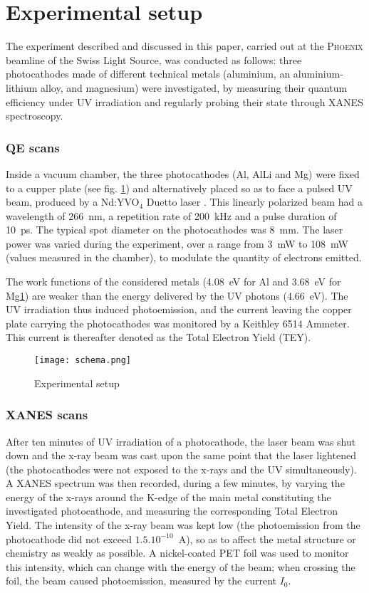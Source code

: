 \documentclass[aip,graphicx]{revtex4-1}
\begin{document}
\section{Experimental setup}

The experiment described and discussed in this paper, carried out at the \textsc{Phoenix} beamline of the Swiss Light Source, was conducted as follows: three photocathodes made of different technical metals (aluminium, an aluminium-lithium alloy, and magnesium) were investigated, by measuring their quantum efficiency under UV irradiation and regularly probing their state through XANES spectroscopy. 

\subsubsection*{QE scans}
Inside a vacuum chamber, the three photocathodes (Al, AlLi and Mg) were fixed to a cupper plate (see fig. \ref{setup}) and alternatively placed so as to face a pulsed UV beam, produced by a Nd:YVO$_4$ Duetto\textsuperscript{\textregistered} laser \cite{Timebandwidth}. This linearly polarized beam had a wavelength of 266~nm, a repetition rate of 200~kHz and a pulse duration of 10~ps. The typical spot diameter on the photocathodes was 8~mm. The laser power was varied during the experiment, over a range from 3~mW to 108~mW (values measured in the chamber), to modulate the quantity of electrons emitted.

The work functions of the considered metals (4.08~eV for Al and 3.68~eV for Mg\ref{}) are weaker than the energy delivered by the UV photons (4.66~eV). The UV irradiation thus induced photoemission, and the current leaving the copper plate carrying the photocathodes was monitored by a Keithley\textsuperscript{\textregistered} 6514 Ammeter. This current is thereafter denoted as the Total Electron Yield (TEY).

\begin{figure}
\texttt{[image: schema.png]}%
\caption{Experimental setup\label{setup}}%
\end{figure}

\subsubsection*{XANES scans}
After ten minutes of UV irradiation of a photocathode, the laser beam was shut down and the x-ray beam was cast upon the same point that the laser lightened (the photocathodes were not exposed to the x-rays and the UV simultaneously). A XANES spectrum was then recorded, during a few minutes, by varying the energy of the x-rays around the K-edge of the main metal constituting the investigated photocathode, and measuring the corresponding Total Electron Yield. The intensity of the x-ray beam was kept low (the photoemission from the photocathode did not exceed $1.5.10^{-10}$~A), so as to affect the metal structure or chemistry as weakly as possible. A nickel-coated PET foil was used to monitor this intensity, which can change with the energy of the beam; when crossing the foil, the beam caused photoemission, measured by the current $I_0$. 
\end{document}
